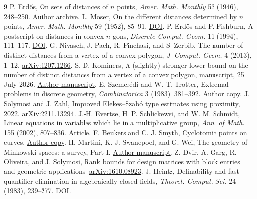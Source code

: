 \documentclass[11pt]{article}
\begin{document}
\begin{thebibliography}{9}
 P. Erd\H{o}s, On sets of distances of \(n\) points, \emph{Amer. Math. Monthly} 53 (1946), 248--250.
\href{https://www.renyi.hu/~p_erdos/1946-03.pdf}{Author archive}.
 L. Moser, On the different distances determined by \(n\) points, \emph{Amer. Math. Monthly} 59 (1952), 85--91.
\href{https://doi.org/10.1080/00029890.1952.11988075}{DOI}.
 P. Erd\H{o}s and P. Fishburn, A postscript on distances in convex \(n\)-gons, \emph{Discrete Comput. Geom.} 11 (1994), 111--117.
\href{https://doi.org/10.1007/BF02573998}{DOI}.
 G. Nivasch, J. Pach, R. Pinchasi, and S. Zerbib, The number of distinct distances from a vertex of a convex polygon, \emph{J. Comput. Geom.} 4 (2013), 1--12.
\href{https://arxiv.org/abs/1207.1266}{arXiv:1207.1266}.
 S. D. Kominers, A (slightly) stronger lower bound on the number of distinct distances from a vertex of a convex polygon, manuscript, 25 July 2026.
\href{https://scottkom.com/assets/articles/Kominers_Distinct_Distances_from_a_Vertex.pdf}{Author manuscript}.
 E. Szemer\'edi and W. T. Trotter, Extremal problems in discrete geometry, \emph{Combinatorica} 3 (1983), 381--392.
\href{https://trotter.math.gatech.edu/papers/38.pdf}{Author copy}.
 J. Solymosi and J. Zahl, Improved Elekes--Szab\'o type estimates using proximity, 2022.
\href{https://arxiv.org/abs/2211.13294}{arXiv:2211.13294}.
 J.-H. Evertse, H. P. Schlickewei, and W. M. Schmidt, Linear equations in variables which lie in a multiplicative group, \emph{Ann. of Math.} 155 (2002), 807--836. \href{https://annals.math.princeton.edu/2002/155-3/p04}{Article}.
 F. Beukers and C. J. Smyth, Cyclotomic points on curves. \href{https://webhomes.maths.ed.ac.uk/~chris/preprints/beukers_smyth.pdf}{Author copy}.
 H. Martini, K. J. Swanepoel, and G. Wei, The geometry of Minkowski spaces: a survey, Part I. \href{https://arxiv.org/abs/0708.2900}{Author manuscript}.
 Z. Dvir, A. Garg, R. Oliveira, and J. Solymosi, Rank bounds for design matrices with block entries and geometric applications. \href{https://arxiv.org/abs/1610.08923}{arXiv:1610.08923}.
 J. Heintz, Definability and fast quantifier elimination in algebraically closed fields, \emph{Theoret. Comput. Sci.} 24 (1983), 239--277. \href{https://doi.org/10.1016/0304-3975(83)90002-6}{DOI}.
\end{thebibliography}
\end{document}
